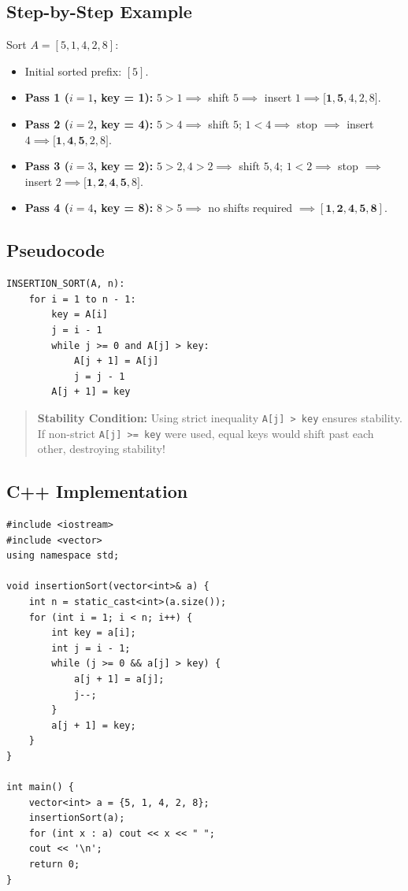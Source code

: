 \subsection{Step-by-Step Example}
Sort $A = [5, 1, 4, 2, 8]$:
\begin{itemize}
    \item Initial sorted prefix: $[5]$.
    \item \textbf{Pass 1 ($i = 1$, key = 1):} $5 > 1 \implies$ shift $5 \implies$ insert $1 \implies \mathbf{[1, 5}, 4, 2, 8]$.
    \item \textbf{Pass 2 ($i = 2$, key = 4):} $5 > 4 \implies$ shift $5$; $1 < 4 \implies$ stop $\implies$ insert $4 \implies \mathbf{[1, 4, 5}, 2, 8]$.
    \item \textbf{Pass 3 ($i = 3$, key = 2):} $5 > 2, 4 > 2 \implies$ shift $5, 4$; $1 < 2 \implies$ stop $\implies$ insert $2 \implies \mathbf{[1, 2, 4, 5}, 8]$.
    \item \textbf{Pass 4 ($i = 4$, key = 8):} $8 > 5 \implies$ no shifts required $\implies \mathbf{[1, 2, 4, 5, 8]}$.
\end{itemize}

\subsection{Pseudocode}

\begin{lstlisting}[style=pseudocode, caption={Insertion Sort Pseudocode.}]
INSERTION_SORT(A, n):
    for i = 1 to n - 1:
        key = A[i]
        j = i - 1
        while j >= 0 and A[j] > key:
            A[j + 1] = A[j]
            j = j - 1
        A[j + 1] = key
\end{lstlisting}

\begin{quote}
\textbf{Stability Condition:} Using strict inequality \texttt{A[j] > key} ensures stability. If non-strict \texttt{A[j] >= key} were used, equal keys would shift past each other, destroying stability!
\end{quote}

\subsection{C++ Implementation}

\begin{lstlisting}[style=cppstyle, caption={C++ Insertion Sort Implementation.}]
#include <iostream>
#include <vector>
using namespace std;

void insertionSort(vector<int>& a) {
    int n = static_cast<int>(a.size());
    for (int i = 1; i < n; i++) {
        int key = a[i];
        int j = i - 1;
        while (j >= 0 && a[j] > key) {
            a[j + 1] = a[j];
            j--;
        }
        a[j + 1] = key;
    }
}

int main() {
    vector<int> a = {5, 1, 4, 2, 8};
    insertionSort(a);
    for (int x : a) cout << x << " ";
    cout << '\n';
    return 0;
}
\end{lstlisting}

